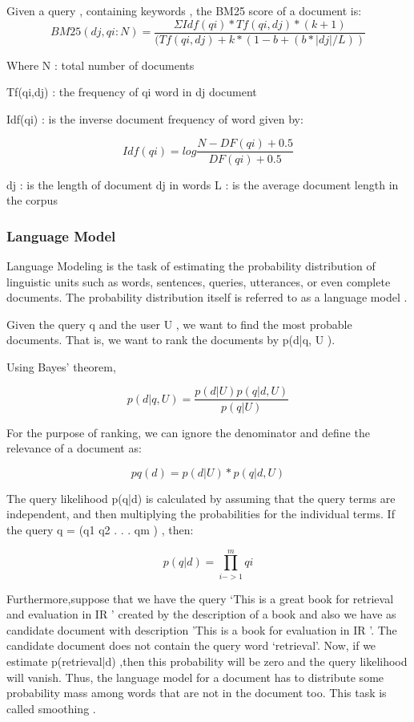 \documentclass{article}
\begin{document}
Given a query , containing keywords , the BM25 score of a document is:
\begin{equation}
BM25(dj,qi:N)= \frac{ ΣIdf(qi)*Tf(qi,dj)*(k+1) } { ( Tf(qi,dj)+k* (1-b+(b*|dj|/L)) }
\end{equation}

Where
N : total number of documents

Tf(qi,dj) : the frequency of qi word in dj document

Idf(qi) : is the inverse document frequency of word given by:

\begin{equation}
Idf(qi) = log \frac{ N-DF(qi) + 0.5 } { DF(qi) +0.5 }
\end{equation}

dj : is the length of document dj in words
L : is the average document length in the corpus

\subsubsection{Language Model}

Language Modeling is the task of estimating the probability distribution of linguistic units such as words, sentences, queries, utterances, or even complete documents. The probability distribution itself is referred to as a language model \cite{CroftLafferty}.


Given the query q and the user U , we want to find the most probable documents. That is, we want to rank the documents by p(d|q, U ).

Using Bayes’ theorem,

\begin{equation}
p(d|q, U ) = \frac{p(d|U )p(q|d, U )} {p(q|U)}
\end{equation}

For the purpose of ranking, we can ignore the denominator and define the relevance of a document as:

\begin{equation}
pq (d) = p(d|U ) * p(q|d, U )
\end{equation}

The query likelihood p(q|d) is calculated by assuming that the query terms are independent, and then multiplying the probabilities for the individual terms. If the query q = (q1 q2 . . . qm ) , then:

\[p(q|d) =\prod_{i->1}^{m} qi\]


Furthermore,suppose that we have the query ‘This is a great book for retrieval and evaluation in IR ’ created by the description of a book and also we have as candidate document with description ’This is a book for evaluation in IR ’. The candidate document does not contain the query word ‘retrieval’. Now, if we estimate p(retrieval|d) ,then this probability will be zero and the query likelihood will vanish. Thus, the language model for a document has to distribute some probability mass among words that are not in the document too. This task is called smoothing  \cite{ZhaiLaferty}.
\end{document}
